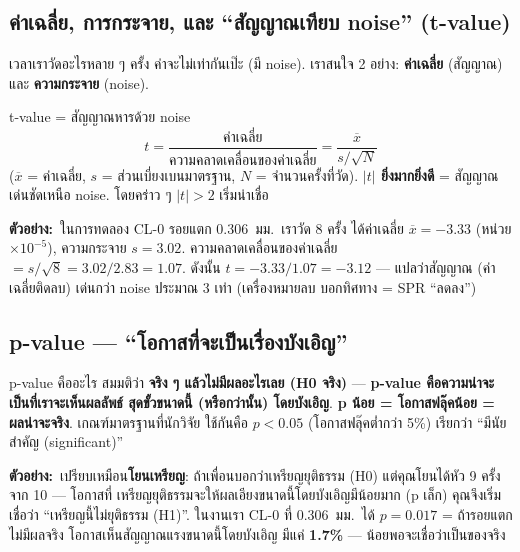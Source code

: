 \documentclass[17pt]{extarticle}
\newcommand{\ex}{\textcolor{ok}{\textbf{ตัวอย่าง:}}\ }
\begin{document}
\subsection{ค่าเฉลี่ย, การกระจาย, และ ``สัญญาณเทียบ noise'' (t-value)}
เวลาเราวัดอะไรหลาย ๆ ครั้ง ค่าจะไม่เท่ากันเป๊ะ (มี noise). เราสนใจ 2 อย่าง: \textbf{ค่าเฉลี่ย} (สัญญาณ) และ
\textbf{ความกระจาย} (noise).

\begin{concept}{t-value = สัญญาณหารด้วย noise}
\[ t=\frac{\text{ค่าเฉลี่ย}}{\text{ความคลาดเคลื่อนของค่าเฉลี่ย}}=\frac{\overline{x}}{s/\sqrt{N}} \]
($\overline{x}$ = ค่าเฉลี่ย, $s$ = ส่วนเบี่ยงเบนมาตรฐาน, $N$ = จำนวนครั้งที่วัด). \textbf{$|t|$ ยิ่งมากยิ่งดี} =
สัญญาณเด่นชัดเหนือ noise. โดยคร่าว ๆ $|t|>2$ เริ่มน่าเชื่อ
\end{concept}
\begin{example}
\ex ในการทดลอง CL-0 รอยแตก 0.306~มม.\ เราวัด 8 ครั้ง ได้ค่าเฉลี่ย $\overline{x}=-3.33$ (หน่วย $\times10^{-5}$),
ความกระจาย $s=3.02$. ความคลาดเคลื่อนของค่าเฉลี่ย $=s/\sqrt{8}=3.02/2.83=1.07$. ดังนั้น
$t=-3.33/1.07=\mathbf{-3.12}$ --- แปลว่าสัญญาณ (ค่าเฉลี่ยติดลบ) เด่นกว่า noise ประมาณ 3 เท่า (เครื่องหมายลบ
บอกทิศทาง = SPR ``ลดลง'')
\end{example}

\subsection{p-value --- ``โอกาสที่จะเป็นเรื่องบังเอิญ''}
\begin{concept}{p-value คืออะไร}
สมมติว่า \textbf{จริง ๆ แล้วไม่มีผลอะไรเลย (H0 จริง)} --- \textbf{p-value คือความน่าจะเป็นที่เราจะเห็นผลลัพธ์
สุดขั้วขนาดนี้ (หรือกว่านั้น) โดยบังเอิญ}. \textbf{p น้อย = โอกาสฟลุ๊คน้อย = ผลน่าจะจริง}. เกณฑ์มาตรฐานที่นักวิจัย
ใช้กันคือ \textbf{$p<0.05$} (โอกาสฟลุ๊คต่ำกว่า 5\%) เรียกว่า ``มีนัยสำคัญ (significant)''
\end{concept}
\begin{example}
\ex เปรียบเหมือน\textbf{โยนเหรียญ}: ถ้าเพื่อนบอกว่าเหรียญยุติธรรม (H0) แต่คุณโยนได้หัว 9 ครั้งจาก 10 --- โอกาสที่
เหรียญยุติธรรมจะให้ผลเอียงขนาดนี้โดยบังเอิญมีน้อยมาก (p เล็ก) คุณจึงเริ่มเชื่อว่า ``เหรียญนี้ไม่ยุติธรรม (H1)''.
ในงานเรา CL-0 ที่ 0.306~มม.\ ได้ $p=0.017$ = ถ้ารอยแตกไม่มีผลจริง โอกาสเห็นสัญญาณแรงขนาดนี้โดยบังเอิญ
มีแค่ \textbf{1.7\%} --- น้อยพอจะเชื่อว่าเป็นของจริง
\end{example}
\end{document}
